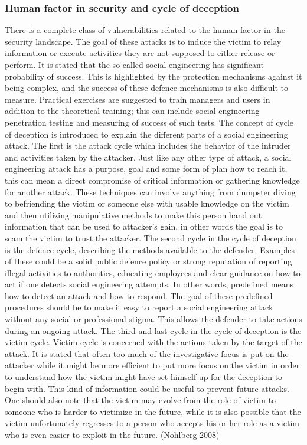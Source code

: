 \documentclass{article}
\begin{document}
\subsubsection{Human factor in security and cycle of deception}
There is a complete class of vulnerabilities related to the human factor in the security landscape. The goal of these attacks is to induce the victim to relay information or execute activities they are not supposed to either release or perform.
It is stated that the so-called social engineering has significant probability of success. This is highlighted by the protection mechanisms against it being complex, and the success of these defence mechanisms is also difficult to measure.
Practical exercises are suggested to train managers and users in addition to the theoretical training; this can include social engineering penetration testing and measuring of success of such tests.
The concept of cycle of deception is introduced to explain the different parts of a social engineering attack. The first is the attack cycle which includes the behavior of the intruder and activities taken by the attacker. Just like any other type of attack, a social engineering attack has a purpose, goal and some form of plan how to reach it, this can mean a direct compromise of critical information or gathering knowledge for another attack. These techniques can involve anything from dumpster diving to befriending the victim or someone else with usable knowledge on the victim and then utilizing manipulative methods to make this person hand out information that can be used to attacker's gain, in other words the goal is to scam the victim to trust the attacker. 
The second cycle in the cycle of deception is the defence cycle, describing the methods available to the defender. Examples of these could be a solid public defence policy or strong reputation of reporting illegal activities to authorities, educating employees and clear guidance on how to act if one detects social engineering attempts. In other words, predefined means how to detect an attack and how to respond. The goal of these predefined procedures should be to make it easy to report a social engineering attack without any social or professional stigma. This allows the defender to take actions during an ongoing attack.
The third and last cycle in the cycle of deception is the victim cycle. Victim cycle is concerned with the actions taken by the target of the attack. It is stated that often too much of the investigative focus is put on the attacker while it might be more efficient to put more focus on the victim in order to understand how the victim might have set himself up for the deception to begin with. This kind of information could be useful to prevent future attacks. One should also note that the victim may evolve from the role of victim to someone who is harder to victimize in the future, while it is also possible that the victim unfortunately regresses to a person who accepts his or her role as a victim who is even easier to exploit in the future. (Nohlberg 2008)
\end{document}
